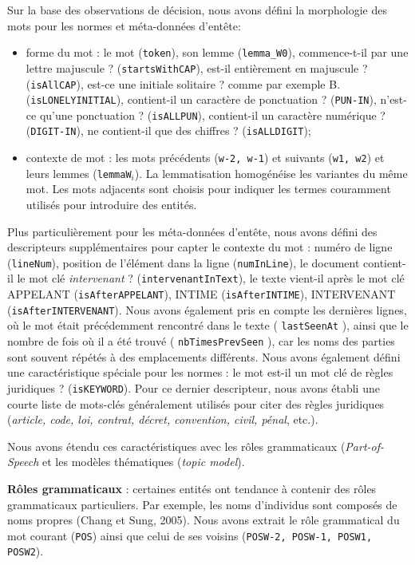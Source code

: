 Sur la base des observations de décision, nous avons défini la morphologie des mots pour les normes et méta-données d'entête:
\begin{itemize}
	\item forme du mot : le mot (\verb|token|), son lemme (\verb|lemma_W0|), \og commence-t-il par une lettre majuscule ? \fg{} (\verb|startsWithCAP|), \og est-il entièrement en majuscule ? \fg{} (\verb|isAllCAP|), \og est-ce une initiale solitaire ? \fg{} comme par exemple \og B. \fg{} (\verb|isLONELYINITIAL|), \og contient-il un caractère de ponctuation ? \fg{} (\verb|PUN-IN|), \og n'est-ce qu'une ponctuation ? \fg{} (\verb|isALLPUN|), \og contient-il un caractère numérique ? \fg{} (\verb|DIGIT-IN|),  \og ne contient-il que 
	des chiffres ? \fg{} (\verb|isALLDIGIT|);
	\item contexte de mot : les mots précédents (\verb|w-2, w-1|) et suivants (\verb|w1, w2|) et leurs lemmes (\verb|lemmaW|$_i$). La lemmatisation homogénéise les variantes du même mot. Les mots adjacents sont choisis pour indiquer les termes couramment utilisés pour introduire des entités.
\end{itemize}

Plus particulièrement pour les méta-données d'entête, nous avons défini des descripteurs supplémentaires pour capter le contexte du mot : numéro de ligne (\verb|lineNum|), position de l'élément dans la ligne (\verb|numInLine|), \og le document contient-il le mot clé \textit{intervenant} ? \fg{} (\verb|intervenantInText|), le texte vient-il après le mot clé \og APPELANT \fg{} (\verb|isAfterAPPELANT|), \og INTIME \fg{} (\verb|isAfterINTIME|), \og INTERVENANT \fg{} (\verb|isAfterINTERVENANT|). Nous avons également pris en compte les dernières lignes, où le mot était précédemment rencontré dans le texte ( \verb|lastSeenAt| ), ainsi que le nombre de fois où il a été trouvé ( \verb|nbTimesPrevSeen| ), car les noms des parties sont souvent répétés à des emplacements différents. Nous avons également défini une caractéristique spéciale pour les normes : \og le mot est-il un mot clé de règles juridiques ? \fg{} (\verb|isKEYWORD|). Pour ce dernier descripteur, nous avons établi une courte liste de mots-clés généralement utilisés pour citer des règles juridiques (\textit{article, code, loi, contrat, décret, convention, civil, pénal}, etc.).

Nous avons étendu ces caractéristiques avec les rôles grammaticaux (\textit{Part-of-Speech} et les modèles thématiques (\textit{topic model}).

\textbf{Rôles grammaticaux} : certaines entités ont tendance à contenir des rôles grammaticaux particuliers. Par exemple, les noms d'individus sont composés de noms propres (Chang et Sung, 2005). Nous avons extrait le rôle grammatical du mot courant (\verb|POS|) ainsi que celui de ses voisins (\texttt{POSW-2, POSW-1, POSW1, POSW2}).

